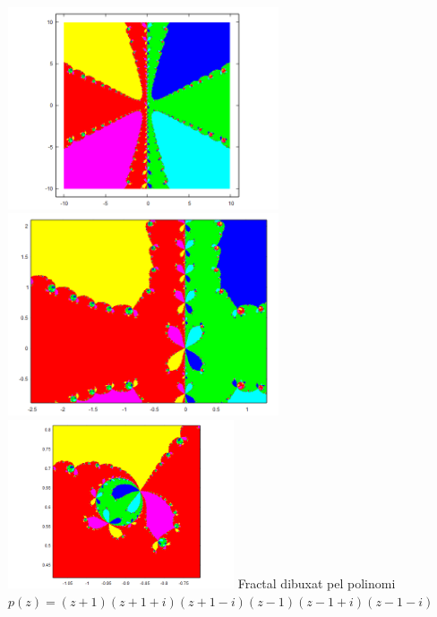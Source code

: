 \documentclass[12pt]{report}
\begin{document}
\begin{center}
    \includegraphics[width=0.6\textwidth]{z6.png}
    \newline
    \includegraphics[width=0.6\textwidth]{z6_zoom.png}
    \newline
    \includegraphics[width=0.5\textwidth]{z6_zoom2.png}
    \newline
\hspace{-6em}Fractal dibuxat pel polinomi $p(z)=(z+1)(z+1+i)(z+1-i)(z-1)(z-1+i)(z-1-i) $
\label{fig:prodcte arrels}
\end{center}
\newpage
\end{document}
